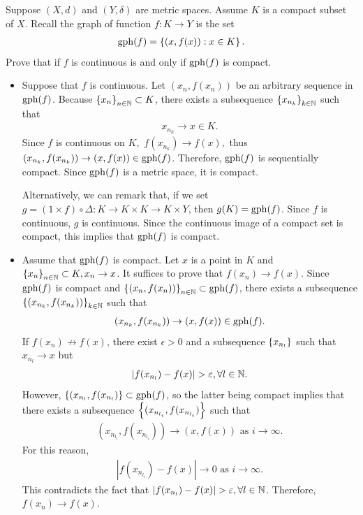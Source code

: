 \begin{problem}
Suppose $(X,d)$ and $(Y,\delta)$ are metric spaces. Assume $K$ is a compact subset of $X.$ Recall the graph of function $f: K \to Y$ is the set
\begin{align*}
    \operatorname{gph}(f) = \left\{ (x,f(x)) : x \in K\right\}.
\end{align*}
Prove that if $f$ is continuous is and only if $\operatorname{gph}(f)$ is compact.
\begin{solution}
\begin{itemize}
    \item[$(\Rightarrow)$] Suppose that $f$ is continuous. Let $(x_n,f(x_n))$ be an arbitrary sequence in $\operatorname{gph}(f)$. Because $\left\{ x_n\right\}_{n\in\mathbb{N}}\subset K$, there exists a subsequence $\left\{ x_{n_k}\right\}_{k\in\mathbb{N}}$ such that 
\begin{align*}
    x_{n_k}\to x\in K.
\end{align*}
Since $f$ is continuous on $K,$ $f(x_{n_k})\to f(x),$ thus $(x_{n_k},f(x_{n_k}))\to (x,f(x))\in \operatorname{gph}(f)$. Therefore, $\operatorname{gph}(f)$ is sequentially compact. Since $\operatorname{gph}(f)$ is a metric space, it is compact.

Alternatively, we can remark that, if we set $g = (1 \times f) \circ \Delta: K \to K \times K \to K \times Y$, then $g(K) = \operatorname{gph}(f)$. Since $f$ is continuous, $g$ is continuous. Since the continuous image of a compact set is compact, this implies that $\operatorname{gph}(f)$ is compact.

\item[$(\Leftarrow)$] Assume that $\operatorname{gph}(f)$ is compact. Let $x$ is a point in $K$ and $\left\{ x_n\right\}_{n \in \mathbb{N}} \subset K, x_n \to x$. It suffices to prove that $f(x_n) \to f(x)$. Since $\operatorname{gph}(f)$ is compact and $\left\{ (x_n, f(x_n))\right\}_{n \in \mathbb{N}} \subset \operatorname{gph}(f)$, there exists a subsequence $\left\{ (x_{n_k}, f(x_{n_k}))\right\}_{k \in \mathbb{N}}$ such that 
\begin{align*}
    (x_{n_k}, f(x_{n_k})) \to (x, f(x)) \in \operatorname{gph}(f).
\end{align*}
If $f(x_n) \not \to f(x)$, there exist $\epsilon > 0$ and a subsequence $\left\{ x_{n_l}\right\}$ such that $x_{n_l}\to x$ but
\begin{align*}
    |f(x_{n_l}) - f(x)| > \varepsilon, \forall l \in \mathbb{N}.
\end{align*}
However, $\left\{ (x_{n_l},f(x_{n_l})\right\} \subset \operatorname{gph} (f)$, so the latter being compact implies that there exists a subsequence $\left\{ (x_{n_{l_i}}, f(x_{n_{l_i}})\right\}$ such that
\begin{align*}
    (x_{n_{l_i}}, f(x_{n_{l_i}})) \to (x, f(x)) \text{ as } i \to \infty.
\end{align*}
For this reason,
\begin{align*}
    |f(x_{n_{l_i}}) - f(x)| \to 0 \text{ as } i \to \infty.
\end{align*}
This contradicts the fact that $|f(x_{n_l}) - f(x)| > \varepsilon, \forall l \in \mathbb{N}$. Therefore, $f(x_n) \to f(x)$.
\end{itemize}
\end{solution}
\end{problem}

